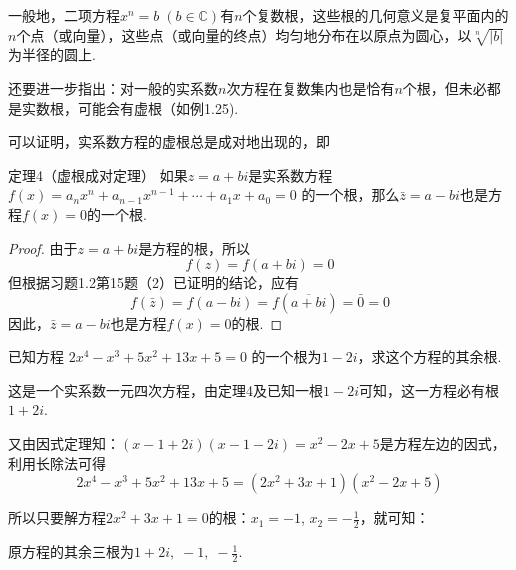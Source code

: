 一般地，二项方程$x^n=b\; (b\in\mathbb{C})$有$n$个复数根，这些根的几何意义是复平面内的$n$个点（或向量），这些点（或向量的终点）均匀地分布在以原点为圆心，以$\sqrt[n]{|b|}$为半径的圆上.

还要进一步指出：对一般的实系数$n$次方程在复数集内也是恰有$n$个根，但未必都是实数根，可能会有虚根（如例1.25).

可以证明，实系数方程的虚根总是成对地出现的，即

\begin{blk}{定理4（虚根成对定理）}
如果$z=a+bi$是实系数方程
$f(x)=a_nx^n+a_{n-1}x^{n-1}+\cdots+a_1x+a_0=0$
的一个根，那么$\bar z=a-bi$也是方程$f(x)=0$的一个根.
\end{blk}

\begin{proof}
    由于$z=a+bi$是方程的根，所以
\[f(z)=f(a+bi)=0\]
但根据习题1.2第15题（2）已证明的结论，应有
\[f(\bar z)=f(a-bi)=f(\overline{a+bi})=\bar 0=0\]
因此，$\bar z=a-bi$也是方程$f(x)=0$的根.
\end{proof}

\begin{example}
    已知方程
$2x^4-x^3+5x^2+13x+5=0$
的一个根为$1-2i$，求这个方程的其余根.
\end{example}

\begin{solution}
    这是一个实系数一元四次方程，由定理4及已知一根$1-2i$可知，这一方程必有根$1+2i$.

又由因式定理知：$(x-1+2i)(x-1-2i)=x^2-2x+5$是方程左边的因式，利用长除法可得
\[2x^4-x^3+5x^2+13x+5=(2x^2+3x+1)(x^2-2x+5)\]

所以只要解方程$2x^2+3x+1=0$的根：$x_1=-1$, $x_2=-\frac{1}{2}$，就可知：

原方程的其余三根为$1+2i,\; -1,\; -\frac{1}{2}$.
\end{solution}

